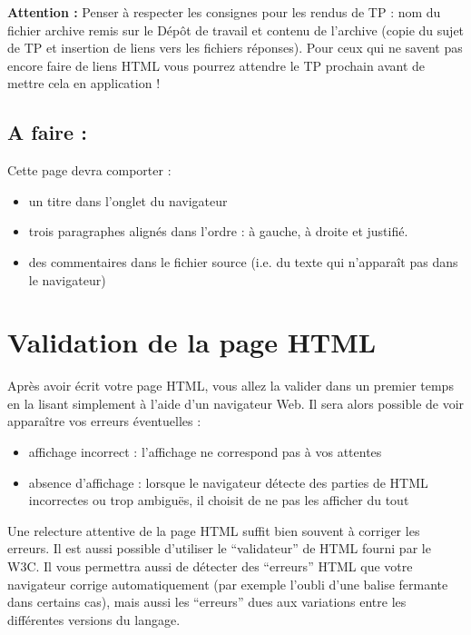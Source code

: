 \documentclass[11pt]{article}
\begin{document}
\textcolor{rougetitre}{\textbf{Attention :}} Penser à respecter les consignes pour les rendus de TP : nom du fichier archive remis sur le Dépôt de travail et contenu de l'archive (copie du sujet de TP et insertion de liens vers les fichiers réponses). Pour ceux qui ne savent pas encore faire de liens HTML vous pourrez attendre le TP prochain avant de mettre cela en application !

\newpage
\subsection{A faire :}

\begin{afaire}
Cette page devra comporter :
\begin{itemize}
    \item un titre dans l'onglet du navigateur
    \item trois paragraphes alignés dans l'ordre : à gauche, à droite et justifié.
    \item des commentaires dans le fichier source (i.e. du texte qui n'apparaît pas dans le navigateur)
\end{itemize}
\end{afaire}

\section{Validation de la page HTML}

Après avoir écrit votre page HTML, vous allez la valider dans un premier temps en la lisant simplement à l'aide d'un navigateur Web. Il sera alors possible de voir apparaître vos erreurs éventuelles :

\begin{itemize}
    \item affichage incorrect : l'affichage ne correspond pas à vos attentes
    \item absence d'affichage : lorsque le navigateur détecte des parties de HTML incorrectes ou trop ambiguës, il choisit de ne pas les afficher du tout
\end{itemize}

Une relecture attentive de la page HTML suffit bien souvent à corriger les erreurs. Il est aussi possible d'utiliser le ``validateur'' de HTML fourni par le W3C. Il vous permettra aussi de détecter des ``erreurs'' HTML que votre navigateur corrige automatiquement (par exemple l'oubli d'une balise fermante dans certains cas), mais aussi les ``erreurs'' dues aux variations entre les différentes versions du langage.
\end{document}
